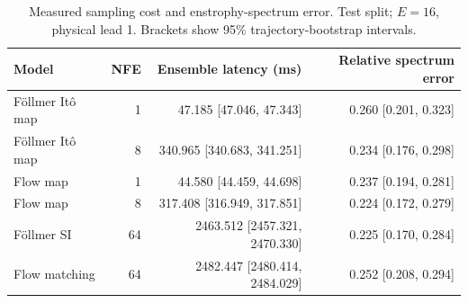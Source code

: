\begin{table}[t]
\centering
\small
\setlength{\tabcolsep}{3pt}
\caption{Measured sampling cost and enstrophy-spectrum error. Test split; $E=16$, physical lead 1. Brackets show 95\% trajectory-bootstrap intervals.}
\label{tab:map-cost}
\begin{tabular}{lrrr}
\toprule
Model & NFE & Ensemble latency (ms) & Relative spectrum error \\
\midrule
Föllmer Itô map & 1 & 47.185 [47.046, 47.343] & 0.260 [0.201, 0.323] \\
Föllmer Itô map & 8 & 340.965 [340.683, 341.251] & 0.234 [0.176, 0.298] \\
\addlinespace
Flow map & 1 & 44.580 [44.459, 44.698] & 0.237 [0.194, 0.281] \\
Flow map & 8 & 317.408 [316.949, 317.851] & 0.224 [0.172, 0.279] \\
\addlinespace
Föllmer SI & 64 & 2463.512 [2457.321, 2470.330] & 0.225 [0.170, 0.284] \\
\addlinespace
Flow matching & 64 & 2482.447 [2480.414, 2484.029] & 0.252 [0.208, 0.294] \\
\bottomrule
\end{tabular}
\end{table}
